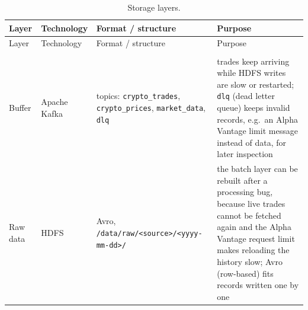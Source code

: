 \documentclass[
]{article}
\begin{document}
\begin{longtable}[]{@{}
  >{\raggedright\arraybackslash}p{}
  >{\raggedright\arraybackslash}p{}
  >{\raggedright\arraybackslash}p{}
  >{\raggedright\arraybackslash}p{}@{}}
\toprule\noalign{}
\begin{minipage}[b]{\linewidth}\raggedright
Layer
\end{minipage} & \begin{minipage}[b]{\linewidth}\raggedright
Technology
\end{minipage} & \begin{minipage}[b]{\linewidth}\raggedright
Format / structure
\end{minipage} & \begin{minipage}[b]{\linewidth}\raggedright
Purpose
\end{minipage} \\
\midrule\noalign{}
\endfirsthead
\toprule\noalign{}
\begin{minipage}[b]{\linewidth}\raggedright
Layer
\end{minipage} & \begin{minipage}[b]{\linewidth}\raggedright
Technology
\end{minipage} & \begin{minipage}[b]{\linewidth}\raggedright
Format / structure
\end{minipage} & \begin{minipage}[b]{\linewidth}\raggedright
Purpose
\end{minipage} \\
\midrule\noalign{}
\endhead
\bottomrule\noalign{}
\caption{Storage layers.}\label{tbl-storage}\tabularnewline
\endlastfoot
Buffer & Apache Kafka & topics: \texttt{crypto\_\allowbreak{}trades}, \texttt{crypto\_\allowbreak{}prices}, \texttt{market\_\allowbreak{}data}, \texttt{dlq} & trades keep arriving while HDFS writes are slow or restarted; \texttt{dlq} (dead letter queue) keeps invalid records, e.g.~an Alpha Vantage limit message instead of data, for later inspection \\
\midrule\noalign{}
Raw data & HDFS & Avro, \texttt{/\allowbreak{}data/\allowbreak{}raw/\allowbreak{}<source>/\allowbreak{}<yyyy-\allowbreak{}mm-\allowbreak{}dd>/\allowbreak{}} & the batch layer can be rebuilt after a processing bug, because live trades cannot be fetched again and the Alpha Vantage request limit makes reloading the history slow; Avro (row-based) fits records written one by one \\

\end{longtable}
\end{document}
